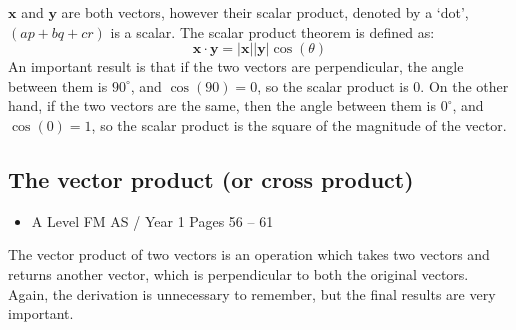 \documentclass[11pt, a4paper]{article}
\begin{document}
$\boldsymbol{x}$ and $\boldsymbol{y}$ are both vectors, however their scalar product, denoted by a `dot', $(ap+bq+cr)$ is a scalar. The scalar product theorem is defined as:
\begin{equation*}
\boldsymbol{x}\cdot\boldsymbol{y}=|\boldsymbol{x}||\boldsymbol{y}|\cos(\theta)
\end{equation*}
An important result is that if the two vectors are perpendicular, the angle between them is $90^{\circ}$, and $\cos(90)=0$, so the scalar product is 0. On the other hand, if the two vectors are the same, then the angle between them is $0^{\circ}$, and $\cos(0)=1$, so the scalar product is the square of the magnitude of the vector.
\vspace{0.5cm}


\subsection{The vector product (or cross product)}
\label{crossproduct}
\begin{itemize}
\item A Level FM AS / Year 1 \hspace{1cm} Pages 56 -- 61
\end{itemize} \par
The vector product of two vectors is an operation which takes two vectors and returns another vector, which is perpendicular to both the original vectors. Again, the derivation is unnecessary to remember, but the final results are very important.\newline\par
\end{document}
